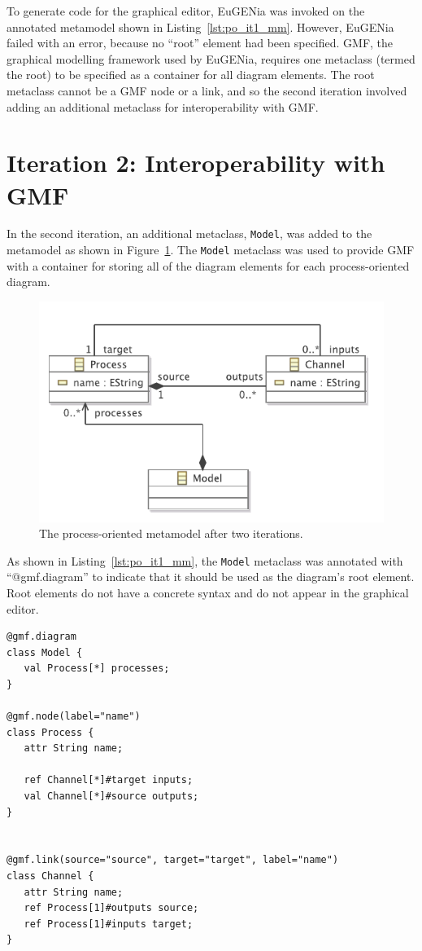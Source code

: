 To generate code for the graphical editor, EuGENia was invoked on the annotated metamodel shown in Listing~\ref{lst:po_it1_mm}. However, EuGENia failed with an error, because no ``root'' element had been specified. GMF, the graphical modelling framework used by EuGENia, requires one metaclass (termed the root) to be specified as a container for all diagram elements. The root metaclass cannot be a GMF node or a link, and so the second iteration involved adding an additional metaclass for interoperability with GMF.


\section{Iteration 2: Interoperability with GMF}
In the second iteration, an additional metaclass, \texttt{Model}, was added to the metamodel as shown in Figure~\ref{fig:po_it2_mm}. The \texttt{Model} metaclass was used to provide GMF with a container for storing all of the diagram elements for each process-oriented diagram.

\begin{figure}[htbp]
	\centering
		\includegraphics[scale=0.75]{A.2.ProcessOriented/images/2_mm.pdf}
	\caption{The process-oriented metamodel after two iterations.}
	\label{fig:po_it2_mm}
\end{figure}

As shown in Listing~\ref{lst:po_it1_mm}, the \texttt{Model} metaclass was annotated with ``@gmf.diagram'' to indicate that it should be used as the diagram's root element. Root elements do not have a concrete syntax and do not appear in the graphical editor.

\begin{lstlisting}[caption=The annotated process-oriented metamodel after two iterations, label=lst:po_it2_mm, language=Emfatic]
@gmf.diagram
class Model {
   val Process[*] processes;
}

@gmf.node(label="name")
class Process {
   attr String name;
      
   ref Channel[*]#target inputs;
   val Channel[*]#source outputs; 
}


@gmf.link(source="source", target="target", label="name")
class Channel { 
   attr String name;
   ref Process[1]#outputs source;
   ref Process[1]#inputs target;
}
\end{lstlisting}

